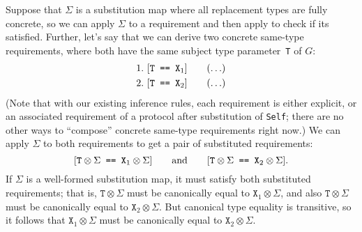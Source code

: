 \documentclass[../generics]{subfiles}
\begin{document}
Suppose that $\Sigma$ is a substitution map where all replacement types are fully concrete, so we can apply $\Sigma$ to a requirement and then apply  to check if its satisfied. Further, let's say that we can derive two concrete same-type requirements, where both have the same subject type parameter~\texttt{T} of $G$:
\begin{gather*}
\AnyStep{\SameReq{T}{$\texttt{X}_1$}}{1}\\
\AnyStep{\SameReq{T}{$\texttt{X}_2$}}{2}
\end{gather*}
(Note that with our existing inference rules, each requirement is either explicit, or an associated requirement of a protocol after substitution of \texttt{Self}; there are no other ways to ``compose'' concrete same-type requirements right now.) We can apply $\Sigma$ to both requirements to get a pair of substituted requirements:
\[ [\texttt{$\texttt{T}\otimes\Sigma$ == $\texttt{X}_1\otimes\Sigma$}]\qquad\text{and}\qquad
   [\texttt{$\texttt{T}\otimes\Sigma$ == $\texttt{X}_2\otimes\Sigma$}]. \]
If $\Sigma$ is a well-formed substitution map, it must satisfy both substituted requirements; that is, $\texttt{T}\otimes\Sigma$ must be canonically equal to $\texttt{X}_1\otimes\Sigma$, and also $\texttt{T}\otimes\Sigma$ must be canonically equal to $\texttt{X}_2\otimes\Sigma$. But canonical type equality is transitive, so it follows that $\texttt{X}_1\otimes\Sigma$ must be canonically equal to $\texttt{X}_2\otimes\Sigma$.
\end{document}
